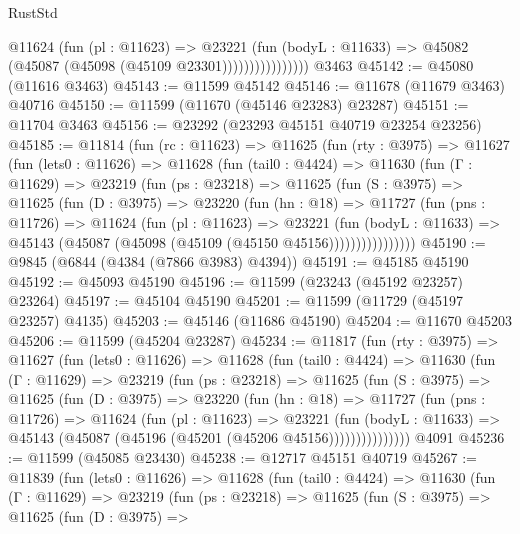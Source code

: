 \begin{lexlean}{RustStd}
\begin{coremodule}
                        @11624
                          (fun (pl : @11623) =>
                          @23221
                            (fun (bodyL : @11633) =>
                            @45082 (@45087 (@45098 (@45109 @23301))))))))))))))))
    @3463
@45142 := @45080 (@11616 @3463)
@45143 := @11599 @45142
@45146 := @11678 (@11679 @3463) @40716
@45150 := @11599 (@11670 (@45146 @23283) @23287)
@45151 := @11704 @3463
@45156 := @23292 (@23293 @45151 @40719 @23254 @23256)
@45185 := @11814
    (fun (rc : @11623) =>
    @11625
      (fun (rty : @3975) =>
      @11627
        (fun (lets0 : @11626) =>
        @11628
          (fun (tail0 : @4424) =>
          @11630
            (fun (Γ : @11629) =>
            @23219
              (fun (ps : @23218) =>
              @11625
                (fun (S : @3975) =>
                @11625
                  (fun (D : @3975) =>
                  @23220
                    (fun (hn : @18) =>
                    @11727
                      (fun (pns : @11726) =>
                      @11624
                        (fun (pl : @11623) =>
                        @23221
                          (fun (bodyL : @11633) =>
                          @45143 (@45087 (@45098 (@45109 (@45150 @45156))))))))))))))))
@45190 := @9845 (@6844 (@4384 (@7866 @3983) @4394))
@45191 := @45185 @45190
@45192 := @45093 @45190
@45196 := @11599 (@23243 (@45192 @23257) @23264)
@45197 := @45104 @45190
@45201 := @11599 (@11729 (@45197 @23257) @4135)
@45203 := @45146 (@11686 @45190)
@45204 := @11670 @45203
@45206 := @11599 (@45204 @23287)
@45234 := @11817
    (fun (rty : @3975) =>
    @11627
      (fun (lets0 : @11626) =>
      @11628
        (fun (tail0 : @4424) =>
        @11630
          (fun (Γ : @11629) =>
          @23219
            (fun (ps : @23218) =>
            @11625
              (fun (S : @3975) =>
              @11625
                (fun (D : @3975) =>
                @23220
                  (fun (hn : @18) =>
                  @11727
                    (fun (pns : @11726) =>
                    @11624
                      (fun (pl : @11623) =>
                      @23221
                        (fun (bodyL : @11633) =>
                        @45143 (@45087 (@45196 (@45201 (@45206 @45156)))))))))))))))
    @4091
@45236 := @11599 (@45085 @23430)
@45238 := @12717 @45151 @40719
@45267 := @11839
    (fun (lets0 : @11626) =>
    @11628
      (fun (tail0 : @4424) =>
      @11630
        (fun (Γ : @11629) =>
        @23219
          (fun (ps : @23218) =>
          @11625
            (fun (S : @3975) =>
            @11625
              (fun (D : @3975) =>

\end{coremodule}
\end{lexlean}
